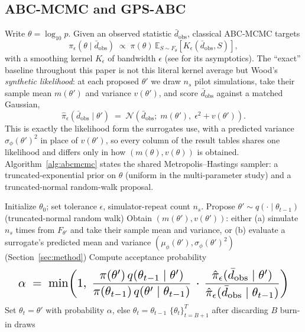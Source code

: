 \documentclass[sn-basic,iicol,pdflatex]{sn-jnl}
\newcommand{\dbar}{\ensuremath{\bar d}}
\begin{document}
\subsection{ABC-MCMC and GPS-ABC}
\label{sec:abcmcmc}

Write $\theta = \log_{10} p$. Given an observed statistic $\dbar_{\mathrm{obs}}$,
classical ABC-MCMC \citep{marjoram2003} targets
\[
\pi_\epsilon(\theta \mid \dbar_{\mathrm{obs}}) \;\propto\; \pi(\theta)\,
\mathbb{E}_{S \sim F_\theta}\!\left[K_\epsilon\!\left(\dbar_{\mathrm{obs}}, S\right)\right],
\]
with a smoothing kernel $K_\epsilon$ of bandwidth $\epsilon$ (see \citealp{frazier2018} for its asymptotics). The ``exact''
baseline throughout this paper is not this literal kernel average but Wood's
\citep{wood2010,price2018} \emph{synthetic likelihood}: at each proposed $\theta'$ we draw
$n_s$ pilot simulations, take their sample mean $m(\theta')$ and variance
$v(\theta')$, and score $\dbar_{\mathrm{obs}}$ against a matched Gaussian,
\[
\hat\pi_\epsilon(\dbar_{\mathrm{obs}} \mid \theta') \;=\;
\mathcal{N}\!\left(\dbar_{\mathrm{obs}};\; m(\theta'),\; \epsilon^2 + v(\theta')\right).
\]
This is exactly the likelihood form the surrogates use, with a predicted
variance $\sigma_\phi(\theta')^2$ in place of $v(\theta')$, so every column of
the result tables shares one likelihood and differs only in how
$(m(\theta), v(\theta))$ is obtained. Algorithm~\ref{alg:abcmcmc} states the
shared Metropolis--Hastings sampler: a truncated-exponential prior on $\theta$
(uniform in the multi-parameter study) and a truncated-normal random-walk
proposal.

\begin{algorithm}[H]
\caption{ABC-MCMC (Metropolis--Hastings, synthetic likelihood)}
\label{alg:abcmcmc}
\begin{algorithmic}[1]
\State Initialize $\theta_0$; set tolerance $\epsilon$, simulator-repeat count $n_s$.
  \State Propose $\theta' \sim q(\cdot \mid \theta_{t-1})$ (truncated-normal random walk)
  \State Obtain $(m(\theta'), v(\theta'))$: either (a) simulate $n_s$ times from $F_{\theta'}$ and take their sample mean and variance, or (b) evaluate a surrogate's predicted mean and variance $(\mu_\phi(\theta'), \sigma_\phi(\theta')^2)$ (Section~\ref{sec:method})
  \State Compute acceptance probability
  \[
  \resizebox{0.95\linewidth}{!}{$\displaystyle\alpha \;=\; \min\!\left(1,\; \frac{\pi(\theta')\,q(\theta_{t-1}\mid\theta')}{\pi(\theta_{t-1})\,q(\theta'\mid\theta_{t-1})}\,\cdot\,\frac{\hat\pi_\epsilon(\dbar_{\mathrm{obs}} \mid \theta')}{\hat\pi_\epsilon(\dbar_{\mathrm{obs}} \mid \theta_{t-1})}\right)$}
  \]
  \State Set $\theta_t = \theta'$ with probability $\alpha$, else $\theta_t = \theta_{t-1}$
\EndFor
\State \Return $\{\theta_t\}_{t=B+1}^{T}$ after discarding $B$ burn-in draws
\end{algorithmic}
\end{algorithm}
\end{document}
